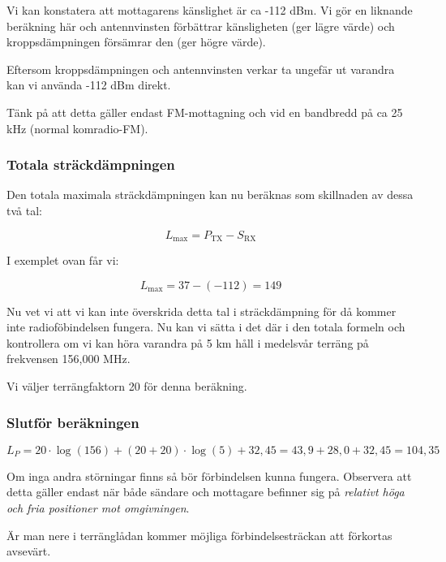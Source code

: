 \documentclass[12ypt,swedish,a4paper]{report}
\begin{document}
Vi kan konstatera att mottagarens känslighet är ca -112 dBm. Vi gör en liknande beräkning här och antennvinsten förbättrar känsligheten (ger lägre värde) och kroppsdämpningen försämrar den (ger högre värde). 

Eftersom kroppsdämpningen och antennvinsten verkar ta ungefär ut varandra kan vi använda -112 dBm direkt.

Tänk på att detta gäller endast FM-mottagning och vid en bandbredd på ca 25 kHz (normal komradio-FM).

\subsubsection{Totala sträckdämpningen}

Den totala maximala sträckdämpningen kan nu beräknas som skillnaden av dessa två tal:

\begin{equation}
L_{\mathrm{max}} = P_{\mathrm{TX}} - S_{\mathrm{RX}}
\end{equation}

I exemplet ovan får vi:

\begin{equation}
L_{\mathrm{max}} = 37 - (-112) = 149
\end{equation}

Nu vet vi att vi kan inte överskrida detta tal i sträckdämpning för då kommer inte radioföbindelsen fungera. Nu kan vi sätta i det där i den totala formeln och kontrollera om vi kan höra varandra på 5 km håll i medelsvår terräng på frekvensen 156,000 MHz.

Vi väljer terrängfaktorn 20 för denna beräkning.

\subsubsection{Slutför beräkningen}

\begin{equation}
L_P=20\cdot\log(156)+(20+20)\cdot\log(5)+32,45 = 43,9 + 28,0 + 32,45 = 104,35
\end{equation}

Om inga andra störningar finns så bör förbindelsen kunna fungera. Observera att detta gäller endast när både sändare och mottagare befinner sig på \textit{relativt höga och fria positioner mot omgivningen}. 

Är man nere i terränglådan kommer möjliga förbindelsesträckan att förkortas avsevärt.
\end{document}
